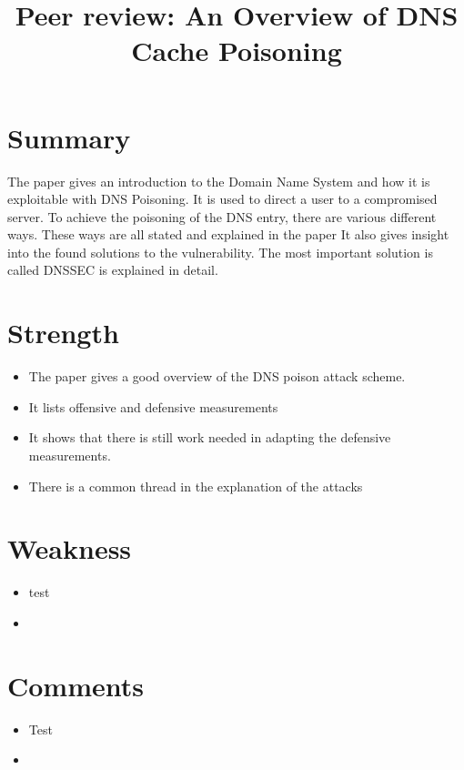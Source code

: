 \documentclass[peerreview, 10pt, onecolumn]{IEEEtran}
\begin{document}
\title{Peer review: An Overview of DNS Cache Poisoning }

\author{}

\IEEEpeerreviewmaketitle

\section*{Summary}
    The paper gives an introduction to the Domain Name System and how it is exploitable with DNS Poisoning.
    It is used to direct a user to a compromised server.
    To achieve the poisoning of the DNS entry, there are various different ways. 
    These ways are all stated and explained in the paper 
    It also gives insight into the found solutions to the vulnerability. 
    The most important solution is called DNSSEC is explained in detail.
\section*{Strength}
    \begin{itemize}
        \renewcommand\labelitemi{+}
        \item The paper gives a good overview of the DNS poison attack scheme.
        \item It lists offensive and defensive measurements
        \item It shows that there is still work needed in adapting the defensive measurements.
        \item There is a common thread in the explanation of the attacks 
    \end{itemize}
\section*{Weakness}
    \begin{itemize}
        \renewcommand\labelitemi{-}
        \item test
        \item 
    \end{itemize}
\section*{Comments}
    \begin{itemize}
        \item Test
        \item 
    \end{itemize}
\end{document}
